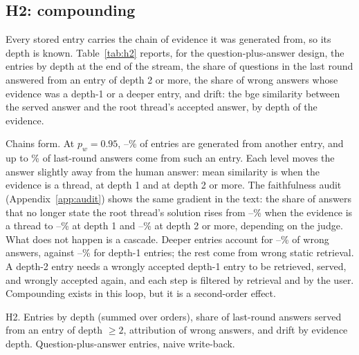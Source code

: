 \documentclass[11pt]{article}
\begin{document}
\subsection{H2: compounding}
Every stored entry carries the chain of evidence it was generated from, so its depth is known. Table~\ref{tab:h2} reports, for the question-plus-answer design, the entries by depth at the end of the stream, the share of questions in the last round answered from an entry of depth 2 or more, the share of wrong answers whose evidence was a depth-1 or a deeper entry, and drift: the bge similarity between the served answer and the root thread's accepted answer, by depth of the evidence.

Chains form. At $p_w=0.95$, \deepShareLo{}--\deepShareHi{}\% of entries are generated from another entry, and up to \selfDTwoHi{}\% of last-round answers come from such an entry. Each level moves the answer slightly away from the human answer: mean similarity is \driftZero{} when the evidence is a thread, \driftOne{} at depth 1 and \driftTwo{} at depth 2 or more. The faithfulness audit (Appendix~\ref{app:audit}) shows the same gradient in the text: the share of answers that no longer state the root thread's solution rises from \auditNoAzZero{}--\auditNoLocZero{}\% when the evidence is a thread to \auditNoAzOne{}--\auditNoLocOne{}\% at depth 1 and \auditNoAzTwo{}--\auditNoLocTwo{}\% at depth 2 or more, depending on the judge. What does not happen is a cascade. Deeper entries account for \wrongDTwoLo{}--\wrongDTwoHi{}\% of wrong answers, against \wrongDOneLo{}--\wrongDOneHi{}\% for depth-1 entries; the rest come from wrong static retrieval. A depth-2 entry needs a wrongly accepted depth-1 entry to be retrieved, served, and wrongly accepted again, and each step is filtered by retrieval and by the user. Compounding exists in this loop, but it is a second-order effect.

\begin{table}[t]\centering\small
\caption{H2. Entries by depth (summed over orders), share of last-round answers served from an entry of depth $\geq2$, attribution of wrong answers, and drift by evidence depth. Question-plus-answer entries, naive write-back.}\label{tab:h2}
\begin{adjustbox}{max width=\linewidth, max totalheight=0.85\textheight}\end{adjustbox}
\end{table}
\end{document}

